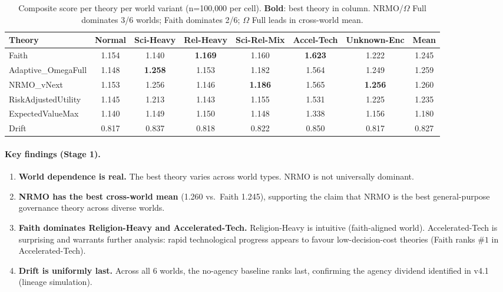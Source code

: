 \begin{table}[ht]
\centering
\small
\begin{tabularx}{\linewidth}{XCCCCCCC}
\toprule
\textbf{Theory} & \textbf{Normal} & \textbf{Sci-Heavy} & \textbf{Rel-Heavy}
& \textbf{Sci-Rel-Mix} & \textbf{Accel-Tech} & \textbf{Unknown-Enc} & \textbf{Mean} \\
\midrule
Faith & 1.154 & 1.140 & \textbf{1.169} & 1.160 & \textbf{1.623} & 1.222 & 1.245 \\
Adaptive\_OmegaFull & 1.148 & \textbf{1.258} & 1.153 & 1.182 & 1.564 & 1.249 & 1.259 \\
NRMO\_vNext & 1.153 & 1.256 & 1.146 & \textbf{1.186} & 1.565 & \textbf{1.256} & 1.260 \\
RiskAdjustedUtility & 1.145 & 1.213 & 1.143 & 1.155 & 1.531 & 1.225 & 1.235 \\
ExpectedValueMax & 1.140 & 1.149 & 1.150 & 1.148 & 1.338 & 1.156 & 1.180 \\
Drift & 0.817 & 0.837 & 0.818 & 0.822 & 0.850 & 0.817 & 0.827 \\
\bottomrule
\end{tabularx}
\caption[Stage 1 cross-world result]{Composite score per theory per
world variant (n=100{,}000 per cell). \textbf{Bold}: best theory in
column. NRMO/$\Omega$ Full dominates 3/6 worlds; Faith dominates 2/6;
$\Omega$ Full leads in cross-world mean.}
\label{tab:vision-stage1-result}
\end{table}

\paragraph{Key findings (Stage 1).}

\begin{enumerate}
\item \textbf{World dependence is real.} The best theory varies across
world types. NRMO is not universally dominant.

\item \textbf{NRMO has the best cross-world mean} (1.260 vs.\ Faith
1.245), supporting the claim that NRMO is the best general-purpose
governance theory across diverse worlds.

\item \textbf{Faith dominates Religion-Heavy and Accelerated-Tech.}
Religion-Heavy is intuitive (faith-aligned world). Accelerated-Tech is
surprising and warrants further analysis: rapid technological progress
appears to favour low-decision-cost theories (Faith ranks $\#1$ in
Accelerated-Tech).

\item \textbf{Drift is uniformly last.} Across all 6 worlds, the no-agency
baseline ranks last, confirming the agency dividend identified in
v4.1 (lineage simulation).
\end{enumerate}

